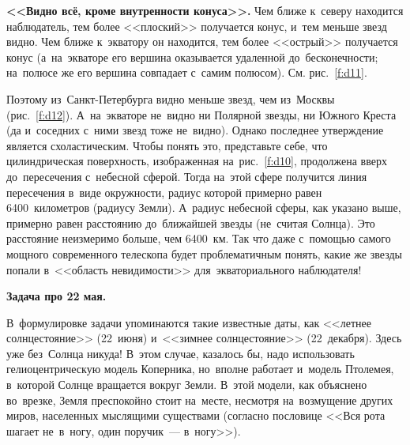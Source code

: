 \textbf{<<Видно всё, кроме внутренности конуса>>.} Чем ближе к~северу находится наблюдатель, тем более
<<плоский>> получается конус, и~тем меньше звезд видно. Чем ближе к~экватору он находится, тем
более <<острый>> получается конус (а~на~экваторе его вершина оказывается удаленной
до~бесконечности; на~полюсе же его вершина совпадает с~самим полюсом). См. рис.~\ref{f:d11}.


Поэтому из~Санкт-Петербурга видно меньше звезд, чем из~Москвы (рис.~\ref{f:d12}). А~на~экваторе не~видно ни
Полярной звезды, ни Южного Креста (да и~соседних с~ними звезд тоже не~видно). Однако
последнее утверждение является схоластическим.
Чтобы понять это,
представьте себе, что цилиндрическая поверхность, изображенная на~рис.~\ref{f:d10}, продолжена вверх
до~пересечения с~небесной сферой. Тогда на~этой сфере получится линия пересечения в~виде
окружности, радиус которой примерно равен 6400~километров (радиусу Земли).
 А~радиус небесной
сферы, как указано выше, примерно равен расстоянию до~ближайшей звезды (не~считая Солнца). Это
расстояние неизмеримо больше, чем 6400~км. Так что даже с~помощью самого мощного современного
телескопа будет проблематичным понять, какие же звезды попали в~<<область невидимости>>
для~экваториального на\-блю\-да\-теля!


\textbf{Задача про 22 мая.}

В~формулировке задачи упоминаются такие известные даты, как <<летнее солнцестояние>> (22~июня)
и~<<зимнее солнцестояние>> (22~декабря). Здесь уже без~Солнца никуда! В~этом случае, казалось бы,
надо использовать гелиоцентрическую модель Коперника, но~вполне работает и~модель Птолемея,
в~которой Солнце вращается вокруг Земли. В~этой модели, как объяснено во~врезке, Земля преспокойно
стоит на~месте, несмотря на~возмущение других миров, населенных мыслящими существами (согласно
пословице <<Вся рота шагает не~в~ногу, один поручик~--- в~ногу>>).


